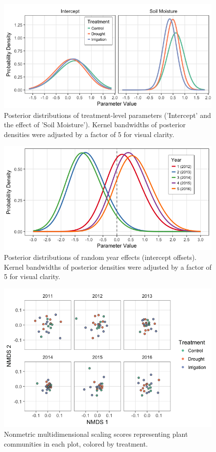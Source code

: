 \documentclass[fleqn,10pt]{wlpeerj} %
\begin{document}
\begin{figure}[!ht]
  \centering
      \includegraphics[width=5in]{../figures/glmm_treatment_posteriors.png}
  \caption{Posterior distributions of treatment-level parameters ('Intercept' and the effect of 'Soil Moisture'). Kernel bandwidths of posterior densities were adjusted by a factor of 5 for visual clarity.}
\end{figure}

\newpage{}

\begin{figure}[!ht]
  \centering
      \includegraphics[width=5in]{../figures/glmm_yeardiffs.png}
  \caption{Posterior distributions of random year effects (intercept offsets). Kernel bandwidths of posterior densities were adjusted by a factor of 5 for visual clarity.}
\end{figure}

\newpage{}

\begin{figure}[!ht]
  \centering
      \includegraphics[width=5in]{../figures/sppcomp_bray_all.png}
  \caption{Nonmetric multidimensional scaling scores representing plant communities in each plot, colored by treatment.}
\end{figure}

\newpage{}



\end{document}
